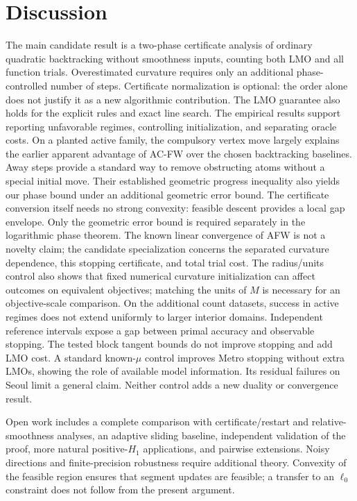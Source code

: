 \documentclass[11pt]{article}
\begin{document}
\section{Discussion}
The main candidate result is a two-phase certificate analysis of ordinary
quadratic backtracking without smoothness inputs, counting both LMO and all
function trials. Overestimated curvature requires only an additional
phase-controlled number of steps. Certificate normalization is optional:
the order alone does not justify it as a new algorithmic contribution.
The LMO guarantee also holds for the explicit rules and exact line search.
The empirical results support reporting unfavorable
regimes, controlling initialization, and separating oracle costs. On a
planted active family, the compulsory vertex move largely explains the
earlier apparent advantage of AC-FW over the chosen backtracking baselines.
Away steps provide a standard way to remove obstructing atoms without a
special initial move. Their established geometric progress inequality
also yields our phase bound under an additional geometric error bound.
The certificate conversion itself needs no strong convexity: feasible
descent provides a local gap envelope. Only the geometric error bound
is required separately in the logarithmic phase theorem.
The known linear convergence of AFW is not a novelty claim; the candidate
specialization concerns the separated curvature dependence, this stopping
certificate, and total trial cost.
The radius/units control also shows that fixed numerical curvature
initialization can affect outcomes on equivalent objectives; matching
the units of $M$ is necessary for an objective-scale comparison.
On the additional count datasets, success in active regimes does not
extend uniformly to larger interior domains. Independent reference
intervals expose a gap between primal accuracy and observable stopping.
The tested block tangent bounds do not improve stopping and add LMO cost.
A standard known-$\mu$ control improves Metro stopping without extra
LMOs, showing the role of available model information. Its residual
failures on Seoul limit a general claim. Neither control adds a new
duality or convergence result.

Open work includes a complete comparison with certificate/restart and
relative-smoothness analyses, an adaptive sliding baseline, independent
validation of the proof, more natural positive-$H_1$
applications, and pairwise extensions. Noisy directions and
finite-precision robustness require additional theory. Convexity of
the feasible region ensures that segment updates are feasible; a transfer
to an $\ell_0$ constraint does not follow from the present argument.
\end{document}
